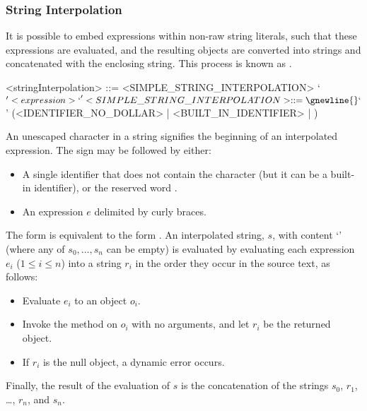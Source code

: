 \documentclass[makeidx]{article}
\begin{document}
{\subsubsection{String Interpolation}

\LMHash{}%
It is possible to embed expressions within non-raw string literals,
such that these expressions are evaluated,
and the resulting objects are converted into strings and
concatenated with the enclosing string.
This process is known as .

\begin{grammar}
<stringInterpolation> ::= <SIMPLE\_STRING\_INTERPOLATION>
  \alt `${' <expression> `}'

<SIMPLE\_STRING\_INTERPOLATION> ::= \gnewline{}
  `$' (<IDENTIFIER\_NO\_DOLLAR> | <BUILT\_IN\_IDENTIFIER> | \THIS)
\end{grammar}


\LMHash{}%
An unescaped \lit{\$} character in a string signifies
the beginning of an interpolated expression.
The \lit{\$} sign may be followed by either:
\begin{itemize}
\item A single identifier \id{} that does not contain the \lit{\$} character
  (but it can be a built-in identifier),
  or the reserved word \THIS.
\item An expression $e$ delimited by curly braces.
\end{itemize}

\LMHash{}%
The form \code{\$\id} is equivalent to the form \code{\$\{\id\}}.
An interpolated string, $s$, with content
`'
(where any of $s_0, \ldots, s_n$ can be empty)
is evaluated by evaluating each expression $e_i$ ($1 \le i \le n$)
into a string $r_i$ in the order they occur in the source text, as follows:
\begin{itemize}
\item Evaluate $e_i$ to an object $o_i$.
\item Invoke the  method on $o_i$ with no arguments,
  and let $r_i$ be the returned object.
\item If $r_i$ is the null object, a dynamic error occurs.
\end{itemize}
Finally, the result of the evaluation of $s$ is
the concatenation of the strings $s_0$, $r_1$, \ldots, $r_n$, and $s_n$.


}
\end{document}
